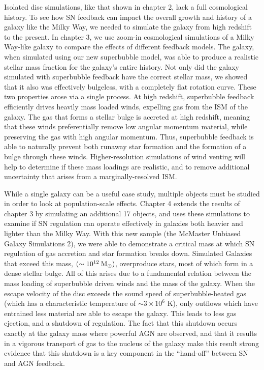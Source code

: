 Isolated disc simulations, like that shown in chapter 2, lack a full
cosmological history.  To see how SN feedback can impact the overall growth and
history of a galaxy like the Milky Way, we needed to simulate the galaxy from
high redshift to the present.  In chapter 3, we use zoom-in cosmological
simulations \citet{Navarro1993} of a Milky Way-like galaxy to compare the
effects of different feedback models.  The galaxy, when simulated using our new
superbubble model, was able to produce a realistic stellar mass fraction for the
galaxy's entire history.  Not only did the galaxy simulated with superbubble
feedback have the correct stellar mass, we showed that it also was effectively
bulgeless, with a completely flat rotation curve.  These two properties arose
via a single process.  At high redshift, superbubble feedback efficiently drives
heavily mass loaded winds, expelling gas from the ISM of the galaxy.  The gas
that forms a stellar bulge is accreted at high redshift, meaning that these
winds preferentially remove low angular momentum material, while preserving the
gas with high angular momentum.  Thus, superbubble feedback is able to naturally
prevent both runaway star formation and the formation of a bulge through these
winds.  Higher-resolution simulations of wind venting will help to determine if
these mass loadings are realistic, and to remove additional uncertainty that
arises from a marginally-resolved ISM.  

While a single galaxy can be a useful case study, multiple objects must be
studied in order to look at population-scale effects.  Chapter 4 extends the
results of chapter 3 by simulating an additional 17 objects, and uses these
simulations to examine if SN regulation can operate effectively in galaxies both
heavier and lighter than the Milky Way.  With this new sample (the McMaster
Unbiased Galaxy Simulations 2), we were able to demonstrate a critical mass at
which SN regulation of gas accretion and star formation breaks down.  Simulated
Galaxies that exceed this mass, $(\sim 10^{12}\>{\rm M_{\odot}})$, overproduce stars,  most
of which form in a dense stellar bulge.  All of this arises due to a fundamental
relation between the mass loading of superbubble driven winds and the mass of
the galaxy.  When the escape velocity of the disc exceeds the sound speed of
superbubble-heated gas (which has a characteristic temperature of
$\sim3\times10^6$ K), only outflows which have entrained less material are able
to escape the galaxy. This leads to less gas ejection, and a shutdown of
regulation.  The fact that this shutdown occurs exactly at the galaxy mass where
powerful AGN are observed, and that it results in a vigorous transport of gas to
the nucleus of the galaxy make this result strong evidence that this shutdown
is a key component in the ``hand-off'' between SN and AGN feedback.


